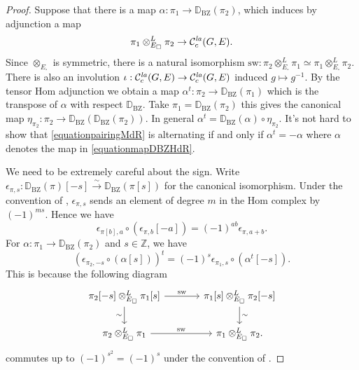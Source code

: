 \documentclass[a4paper,10pt]{amsart}
\theoremstyle{remark}
\theoremstyle{definition}
\theoremstyle{plain}
\numberwithin{equation}{section}
\newcommand{\bbD}{{\mathbb D}}
\newcommand{\bbZ}{{\mathbb Z}}
\newcommand{\calC}{{\mathcal C}}
\newcommand{\la}{{\it la}}
\newcommand{\BZ}{\ensuremath{\mathrm{BZ}}}
\begin{document}
\begin{proof}
	Suppose that there is a map $\alpha:\pi_1\rightarrow \bbD_{\BZ}(\pi_2)$, which induces by adjunction a map 
	\[\pi_1\otimes_{E_{\square}}^L\pi_2\rightarrow \calC_c^{\la}(G,E).\]
	Since $\otimes_{E_{\square}}$ is symmetric, there is a natural isomorphism $\mathrm{sw}:\pi_2\otimes_{E_{\square}}^L\pi_1\simeq \pi_1\otimes_{E_{\square}}^L\pi_2$. There is also an involution $\iota:\calC_c^{\la}(G,E)\to \calC_c^{\la}(G,E)$ induced $g\mapsto g^{-1}$. By the tensor Hom adjunction we obtain a map $\alpha^t:\pi_2\rightarrow\bbD_{\BZ}(\pi_1)$ which is the transpose of $\alpha$ with respect $\bbD_{\BZ}$. Take $\pi_1=\bbD_{\BZ}(\pi_2)$ this gives the canonical map $\eta_{\pi_2}:\pi_2\to \bbD_{\BZ}(\bbD_{\BZ}(\pi_2))$. In general $\alpha^{t}=\bbD_{\BZ}(\alpha)\circ \eta_{\pi_2}$. It's not hard to show that \eqref{equationpairingMdR} is alternating if and only if $\alpha^{t}=-\alpha$ where $\alpha$ denotes the map in \eqref{equationmapDBZHdR}. 

	We need to be extremely careful about the sign. Write $\epsilon_{\pi,s}:\bbD_{\BZ}(\pi)[-s]\xrightarrow{\sim}\bbD_{\BZ}(\pi[s])$ for the canonical isomorphism. Under the convention of \cite[\href{https://stacks.math.columbia.edu/tag/0FNG}{Tag~0FNG}, (9)]{stacks-project}, $\epsilon_{\pi,s}$ sends an element of degree $m$ in the Hom complex by $(-1)^{ms}$. Hence we have
	\begin{equation}\label{equationdualshiftcomposition}
	    \epsilon_{\pi[b],a}\circ(\epsilon_{\pi,b}[-a])=(-1)^{ab}\epsilon_{\pi,a+b}.
	\end{equation}
	For $\alpha:\pi_1\to\bbD_{\BZ}(\pi_2)$ and $s\in\bbZ$, we have
	\begin{equation}\label{equationtransposeshiftexplicit}
	    (\epsilon_{\pi_2,-s}\circ(\alpha[s]))^t=(-1)^s\epsilon_{\pi_1,s}\circ(\alpha^t[-s]).
	\end{equation}
	This is because the following diagram
	\[
	\begin{tikzcd}[column sep=large]
	    \pi_2[-s]\otimes_{E_\square}^L\pi_1[s]
	    \arrow[r,"\mathrm{sw}"]\arrow[d,"\sim"']
	    & \pi_1[s]\otimes_{E_\square}^L\pi_2[-s]
	    \arrow[d,"\sim"]\\
	    \pi_2\otimes_{E_\square}^L\pi_1
	    \arrow[r,"\mathrm{sw}"]
	    & \pi_1\otimes_{E_\square}^L\pi_2.
	\end{tikzcd}
	\]
	commutes up to $(-1)^{s^2}=(-1)^s$ under the convention of \cite[\href{https://stacks.math.columbia.edu/tag/0FNG}{Tag~0FNG}]{stacks-project}.


\end{proof}
\end{document}
